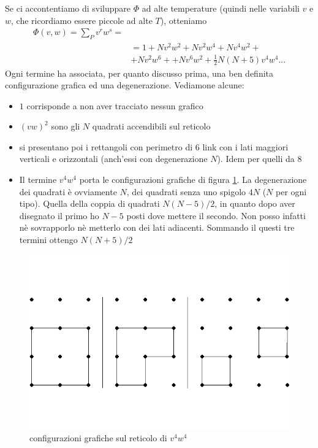 \documentclass[11pt]{article}
\begin{document}
Se ci accontentiamo di sviluppare $\Phi$ ad alte temperature (quindi nelle variabili $v$ e $w$, che ricordiamo essere piccole ad alte $T$), otteniamo
\begin{equation}
\begin{split}
\Phi(v,w)=\sum_Pv^rw^s=\\
&=1+Nv^2w^2+Nv^2w^4+Nv^4w^2+
\\&+Nv^2w^6++Nv^6w^2+\frac{1}{2}N(N+5)v^4w^4...
\end{split}
\label{primiserie}
\end{equation}
Ogni termine ha associata, per quanto discusso prima, una ben definita configurazione grafica ed una degenerazione. Vediamone alcune:
\begin{itemize}
\item{ $1$ corrisponde a non aver tracciato nessun grafico} 
\item{$(vw)^2$ sono gli $N$ quadrati accendibili sul reticolo}
\item{ si presentano poi i rettangoli con perimetro di $6$ link con i lati maggiori verticali e orizzontali (anch'essi con degenerazione $N$). Idem per quelli da $8$}
\item{Il termine $v^4w^4$ porta le configurazioni grafiche di figura \ref{v4w4}. La degenerazione dei quadrati è ovviamente $N$, dei quadrati senza uno spigolo $4N$ ($N$ per ogni tipo). Quella della coppia di quadrati $N(N-5)/2$, in quanto dopo aver disegnato il primo ho $N-5$ posti dove mettere il secondo. Non posso infatti nè sovrapporlo nè metterlo con dei lati adiacenti. Sommando il questi tre termini ottengo $N(N+5)/2$}
\end{itemize} 
\begin{figure}[h]
\centering
\includegraphics[width=0.73\columnwidth]{sat3}
\caption{configurazioni grafiche sul reticolo di $v^4w^4$ }
\label{v4w4}
\end{figure}
\end{document}
